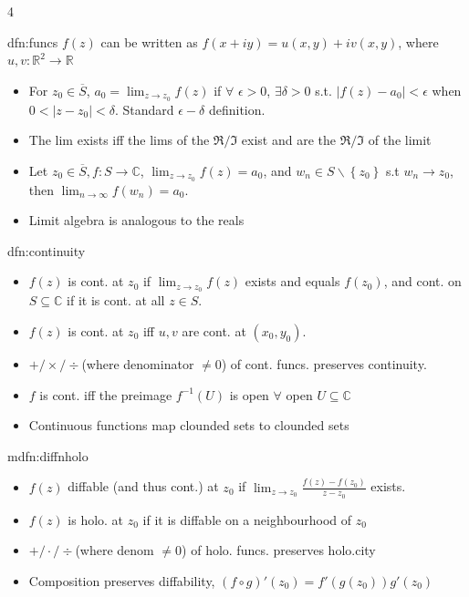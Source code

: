 \documentclass[landscape, 8pt]{extarticle}
\begin{document}
\begin{multicols*}{4}
		
		\begin{dfn}{dfn:funcs}{ }
			$f(z)$ can be written as $f(x+iy) = u(x, y) + iv(x, y)$, where $u, v: \mathbb{R}^2 \to \mathbb{R}$
			\begin{itemize}
				\item For $z_0 \in \overline{S}$, $a_0 = \lim_{z\to z_0}f(z)$ if $\forall$ $\epsilon > 0$, $\exists \delta > 0$ s.t. $\left|f(z) - a_0\right| <\epsilon$ when $0 < \left|z - z_0\right| < \delta$. Standard $\epsilon - \delta$ definition.
				\item The lim exists iff the lims of the $\Re / \Im$ exist and are the $\Re / \Im$ of the limit
				\item Let $z_0 \in \overline{S}, f: S \to \mathbb{C}$, $\lim_{z\to z_0}f(z) = a_0$, and $w_n \in S \backslash \left\{z_0\right\}$ s.t $w_n \to z_0$, then $\lim_{n\to \infty} f(w_n) = a_0$.
				\item Limit algebra is analogous to the reals
			\end{itemize}
			
		\end{dfn}
		
		
		\begin{dfn}[Continuity]{dfn:continuity}{ }
			\begin{itemize}
				\item $f(z)$ is cont. at $z_0$ if $\lim_{z\to z_0} f(z)$ exists and equals $f(z_0)$, and cont. on $S \subseteq \mathbb{C}$ if it is cont. at all $z \in S$. 
				\item $f(z)$ is cont. at $z_0$ iff $u, v$ are cont. at $(x_0, y_0)$.
				\item $+/\times/\div$(where denominator $\ne 0$) of cont. funcs. preserves continuity.
				\item $f$ is cont. iff the preimage $f^{-1}(U)$ is open $\forall$ open $U \subseteq \mathbb{C}$
				\item Continuous functions map clounded sets to clounded sets
			\end{itemize}
			
		\end{dfn}
		
		
		\begin{mdfn}{mdfn:diffnholo}{ }
			\begin{itemize}
				\item $f(z)$ diffable (and thus cont.) at $z_0$ if $\lim_{z \to z_0} \frac{f(z) - f(z_0)}{z-z_0}$ exists.
				\item $f(z)$ is holo. at $z_0$ if it is diffable on a neighbourhood of $z_0$
				\item $+/\cdot / \div$(where denom $\ne 0$) of holo. funcs. preserves holo.city
				\item Composition preserves diffability, $(f \circ g)'(z_0) = f'(g(z_0))g'(z_0)$
			\end{itemize}
			

\end{mdfn}
\end{multicols*}
\end{document}
